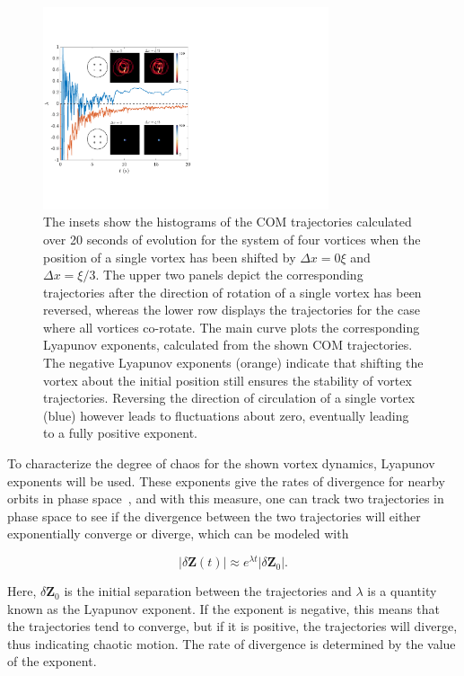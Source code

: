 \begin{figure}
\center \includegraphics[width=0.75\textwidth]{data/2d/lyap/lyap}

\caption{
The insets show the histograms of the COM trajectories calculated over 20 seconds of evolution for the system of four vortices when the position of a single vortex has been shifted by $\Delta x=0\xi$ and $\Delta x=\xi/3$.
The upper two panels depict the corresponding trajectories after the direction of rotation of a single vortex has been reversed, whereas the lower row displays the trajectories for the case where all vortices co-rotate.
The main curve plots the corresponding Lyapunov exponents,  calculated from the shown COM trajectories. 
The negative Lyapunov exponents (orange) indicate that shifting the vortex about the initial position still ensures the stability of vortex trajectories. Reversing the direction of circulation of a single vortex (blue) however leads to fluctuations about zero, eventually leading to a fully positive exponent. 
}
\label{fig:lyap}
\end{figure}


To characterize the degree of chaos for the shown vortex dynamics, Lyapunov exponents will be used.
These exponents give the rates of divergence for nearby orbits in phase space~\cite{wolf1985},
and with this measure, one can track two trajectories in phase space to see if the divergence between the two trajectories will either exponentially converge or diverge, which can be modeled with

\begin{equation}
|\delta\mathbf{Z}(t)| \approx e^{\lambda t} |\delta \mathbf{Z}_0|.
\end{equation}

\noindent Here, $\delta\mathbf{Z}_0$ is the initial separation between the trajectories and $\lambda$ is a quantity known as the Lyapunov exponent.
If the exponent is negative, this means that the trajectories tend to converge, but if it is positive, the trajectories will diverge, thus indicating chaotic motion.
The rate of divergence is determined by the value of the exponent.

